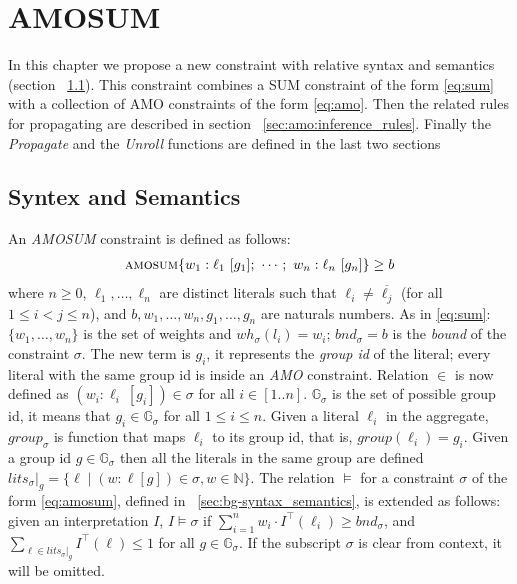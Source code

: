 \chapter{AMOSUM}
\label{cp:AMOSUM}
In this chapter we propose a new constraint with 
relative syntax and semantics (section ~\ref{sec:amo:syntax_semantics}).
This constraint combines a SUM constraint of the form  \eqref{eq:sum} 
with a collection of AMO constraints of the form \eqref{eq:amo}.
Then the related rules for propagating are described in section ~\ref{sec:amo:inference_rules}.
Finally the \textit{Propagate} and the \textit{Unroll} functions are defined 
in the last two sections

\section{Syntex and Semantics}
\label{sec:amo:syntax_semantics}
An \textit{AMOSUM} constraint is defined as follows:
\begin{align}\label{eq:amosum}
    \textsc{amosum}\{w_1 : \ell_1\ [g_1];\ \cdots;\ w_n : \ell_n\ [g_n]\} \geq b
\end{align} 
where $n \geq 0$, $\ell_1,\ldots,\ell_n$ are distinct literals such that $\ell_i \neq \overline{\ell_j}$ (for all $1 \leq i < j \leq n$),
and $b,w_1,\ldots,w_n,g_1,\ldots,g_n$ are naturals numbers. 
As in \eqref{eq:sum}: $\{w_1,\ldots,w_n\}$ is the set of weights and $\mathit{wh}_{\sigma}(l_i) = w_i$;
$\mathit{bnd}_{\sigma} = b$ is the \textit{bound} of the constraint $\sigma$.
The new term is $g_i$, it represents the \textit{group id} of the literal; every literal with the same 
group id is inside an \textit{AMO} constraint.
Relation ${}\in{}$ is now defined as $(w_i : \ell_i\ [g_i]) \in \sigma$ for all $i \in [1..n]$.
$\mathbb{G}_{\sigma}$ is the set of possible group id, it means that $g_i \in \mathbb{G}_{\sigma}$ for all $1 \leq i \leq n$.
Given a literal $\ell_i$ in the aggregate,  $\mathit{group}_{\sigma}$ is function that maps $\ell_i$ to its group id, that is, $\mathit{group}(\ell_i) = g_i$.
Given a group id $g \in \mathbb{G}_ {\sigma}$ then all the literals in the same group are 
defined $\mathit{lits}_{\sigma}|_g = \{ \ell \mid (w : \ell [g]) \in \sigma, w \in \mathbb{N}\}$.
The relation $\models$ for a constraint $\sigma$ of the form \eqref{eq:amosum}, defined in ~\ref{sec:bg-syntax_semantics}, is
extended as follows: given an interpretation $I$, $I \models \sigma$ if $\sum_{i = 1}^{n}{w_i \cdot I^{\top}(\ell_i)} \geq \mathit{bnd}_\sigma$,
and $\sum_{\ell \in \mathit{lits}_{\sigma}{|_g}}{I^{\top}(\ell)} \leq 1$ for all $g \in \mathbb{G}_\sigma$.
If the subscript $\sigma$ is clear from context, it will be omitted.

